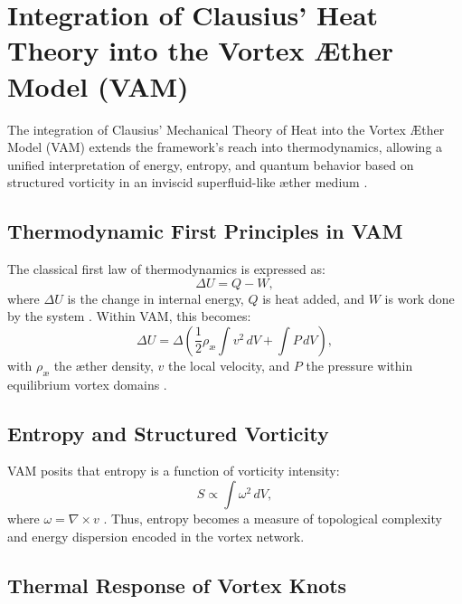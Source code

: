 

\section{Integration of Clausius' Heat Theory into the Vortex \AE ther Model (VAM)}

The integration of Clausius' Mechanical Theory of Heat into the Vortex \AE ther Model (VAM) extends the framework's reach into thermodynamics,
allowing a unified interpretation of energy, entropy, and quantum behavior based on structured vorticity in an inviscid superfluid-like \ae ther
medium \cite{clausius1865mechanical, maxwell1865electromagnetic, helmholtz1858integrals}.

\subsection{Thermodynamic First Principles in VAM}

The classical first law of thermodynamics is expressed as:
\begin{equation}
\Delta U = Q - W,
\end{equation}
where $\Delta U$ is the change in internal energy, $Q$ is heat added, and $W$ is work done by the system \cite{clausius1865mechanical}. Within VAM, this becomes:
\begin{equation}
\Delta U = \Delta \left( \frac{1}{2} \rho_{\text{\ae}} \int v^2 \, dV + \int P \, dV \right),
\end{equation}
with $\rho_{\text{\ae}}$ the æther density, $v$ the local velocity, and $P$ the pressure within equilibrium vortex domains \cite{vam2025unified}.

\subsection{Entropy and Structured Vorticity}

VAM posits that entropy is a function of vorticity intensity:
\begin{equation}
S \propto \int \omega^2 \, dV,
\end{equation}
where $\omega = \nabla \times v$ \cite{kelvin1867vortex}. Thus, entropy becomes a measure of topological complexity and energy dispersion encoded in the vortex network.

\subsection{Thermal Response of Vortex Knots}

